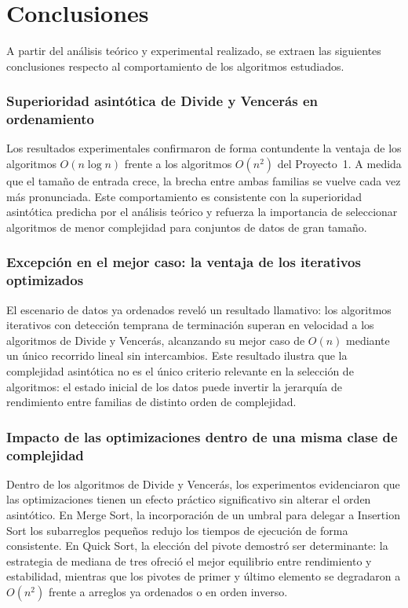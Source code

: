 \section{Conclusiones}\label{sec:conclusiones}
A partir del análisis teórico y experimental realizado, se extraen las siguientes conclusiones respecto al comportamiento de los algoritmos estudiados.

\subsubsection*{Superioridad asintótica de Divide y Vencerás en ordenamiento}

Los resultados experimentales confirmaron de forma contundente la ventaja de los algoritmos $O(n \log n)$ frente a los algoritmos $O(n^2)$ del Proyecto~1. A medida que el tamaño de entrada crece, la brecha entre ambas familias se vuelve cada vez más pronunciada. Este comportamiento es consistente con la superioridad asintótica predicha por el análisis teórico y refuerza la importancia de seleccionar algoritmos de menor complejidad para conjuntos de datos de gran tamaño.

\subsubsection*{Excepción en el mejor caso: la ventaja de los iterativos optimizados}

El escenario de datos ya ordenados reveló un resultado llamativo: los algoritmos iterativos con detección temprana de terminación superan en velocidad a los algoritmos de Divide y Vencerás, alcanzando su mejor caso de $O(n)$ mediante un único recorrido lineal sin intercambios. Este resultado ilustra que la complejidad asintótica no es el único criterio relevante en la selección de algoritmos: el estado inicial de los datos puede invertir la jerarquía de rendimiento entre familias de distinto orden de complejidad.

\subsubsection*{Impacto de las optimizaciones dentro de una misma clase de complejidad}

Dentro de los algoritmos de Divide y Vencerás, los experimentos evidenciaron que las optimizaciones tienen un efecto práctico significativo sin alterar el orden asintótico. En Merge Sort, la incorporación de un umbral para delegar a Insertion Sort los subarreglos pequeños redujo los tiempos de ejecución de forma consistente. En Quick Sort, la elección del pivote demostró ser determinante: la estrategia de mediana de tres ofreció el mejor equilibrio entre rendimiento y estabilidad, mientras que los pivotes de primer y último elemento se degradaron a $O(n^2)$ frente a arreglos ya ordenados o en orden inverso.

